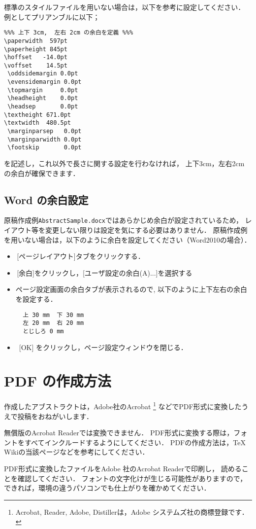 \documentclass[twoside,twocolumn,11pt]{jarticle}  %
\begin{document}
標準のスタイルファイルを用いない場合は，以下を参考に設定してください．
例としてプリアンブルに以下； 
\begin{verbatim}
%%% 上下 3cm,  左右 2cm の余白を定義 %%%
\paperwidth  597pt
\paperheight 845pt
\hoffset   -14.0pt
\voffset    14.5pt
 \oddsidemargin 0.0pt
 \evensidemargin 0.0pt
 \topmargin     0.0pt
 \headheight    0.0pt
 \headsep       0.0pt
\textheight 671.0pt 
\textwidth  480.5pt
 \marginparsep   0.0pt
 \marginparwidth 0.0pt
 \footskip       0.0pt
\end{verbatim}
を記述し，これ以外で長さに関する設定を行わなければ， 上下3cm，左右2cm の余白が確保できます．

\subsection{Word の余白設定}
原稿作成例\texttt{AbstractSample.docx}ではあらかじめ余白が設定されているため，
レイアウト等を変更しない限りは設定を気にする必要はありません．
原稿作成例を用いない場合は，以下のように余白を設定してください（Word2010の場合）． 

\begin{itemize}
\item \,[ページレイアウト]タブをクリックする．
\item \,[余白]をクリックし，[ユーザ設定の余白(A)...]を選択する
\item ページ設定画面の余白タブが表示されるので, 以下のように上下左右の余白を設定する．
\begin{verbatim}
  上 30 mm  下 30 mm 
  左 20 mm  右 20 mm 
  とじしろ 0 mm    
\end{verbatim}
\item ~[OK] をクリックし，ページ設定ウィンドウを閉じる．
\end{itemize}

\section{PDF の作成方法}

作成したアブストラクトは，Adobe社のAcrobat
\footnote{Acrobat\TM, Reader\TM, Adobe\TM, Distiller\TM は，Adobe システムズ社の商標登録です．}
などでPDF形式に変換したうえで投稿をおねがいします．

無償版のAcrobat Readerでは変換できません．
PDF形式に変換する際は，フォントをすべてインクルードするようにしてください．
PDFの作成方法は，TeX Wikiの当該ページ\cite{texwiki}などを参考にしてください．

PDF形式に変換したファイルをAdobe 社のAcrobat Readerで印刷し，
読めることを確認してください．
フォントの文字化けが生じる可能性がありますので，
できれば，環境の違うパソコンでも仕上がりを確かめてください．
\end{document}
